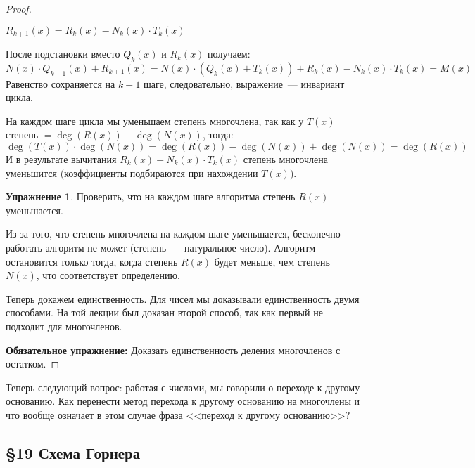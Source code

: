 \documentclass[russian]{lecture-notes}
\theoremstyle{definition}
\newtheorem*{exercise}{Упражнение}
\DeclareMathOperator{\Deg}{deg}
\newcommand{\D}[1]{\Deg(#1)}
\begin{document}
\begin{proof}
\begin{note}
            $R_{k+1}(x) = R_k(x) - N_k(x) \cdot T_k(x)$

            \noindent После подстановки вместо $Q_k(x)$ и $R_k(x)$ получаем:
            \[
                N(x) \cdot Q_{k+1}(x) + R_{k+1}(x) =  N(x) \cdot( Q_k(x) + T_k(x)) +R_k(x) - N_k(x) \cdot T_k(x) = M(x)
            \]
            Равенство сохраняется на $k+1$ шаге, следовательно, выражение~--- инвариант цикла.
        \end{note}

        На каждом шаге цикла мы уменьшаем степень многочлена, так как у $T(x)$ степень $= \D{R(x)} - \D{N(x)}$, тогда:
        \[
            \D{T(x)} \cdot \D{N(x)} = \D{R(x)} - \D{N(x)} + \D{N(x)} = \D{R(x)}
        \]
        И в результате вычитания $R_k(x) - N_k(x) \cdot T_k(x)$ степень многочлена уменьшится (коэффициенты подбираются при нахождении $T(x)$).

        \begin{exercise}
            Проверить, что на каждом шаге алгоритма степень $R(x)$ уменьшается.
        \end{exercise}

        Из-за того, что степень многочлена на каждом шаге уменьшается, бесконечно работать алгоритм не может (степень~--- натуральное число). Алгоритм остановится только тогда, когда степень $R(x)$ будет меньше, чем степень $N(x)$, что соответствует определению.

        Теперь докажем единственность. Для чисел мы доказывали единственность двумя способами. На той лекции был доказан второй способ, так как первый не подходит для многочленов.

        \noindent\textbf{Обязательное упражнение:} Доказать единственность деления многочленов с остатком.

    \end{proof}

    Теперь следующий вопрос: работая с числами, мы говорили о переходе к другому основанию. Как перенести метод перехода к другому основанию на многочлены и что вообще означает в этом случае фраза <<переход к другому основанию>>?

    \begin{center}
        \section*{\LARGE\S 19 Схема Горнера}
        \label{par:gorner}
    \end{center}
\end{document}
